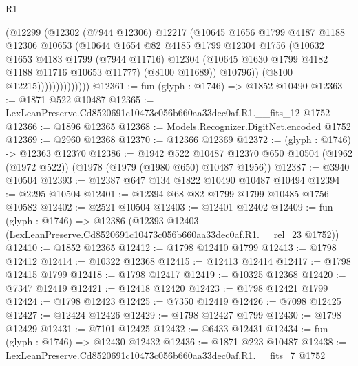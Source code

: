 \begin{lexlean}{R1}
\begin{coremodule}
                          (@12299
                            (@12302
                              (@7944 @12306)
                              @12217
                              (@10645
                                @1656
                                @1799
                                @4187
                                @1188
                                @12306
                                @10653
                                (@10644
                                  @1654
                                  @82
                                  @4185
                                  @1799
                                  @12304
                                  @1756
                                  (@10632
                                    @1653
                                    @4183
                                    @1799
                                    (@7944 @11716)
                                    @12304
                                    (@10645 @1630 @1799 @4182 @1188 @11716 @10653 @11777)
                                    (@8100 @11689))
                                  @10796))
                              (@8100 @12215))))))))))))))
@12361 := fun (glyph : @1746) => @1852 @10490
@12363 := @1871 @522 @10487
@12365 := LexLeanPreserve.Cd8520691c10473c056b660aa33dec0af.R1.__fits_12 @1752
@12366 := @1896 @12365
@12368 := Models.Recognizer.DigitNet.encoded @1752
@12369 := @2960 @12368
@12370 := @12366 @12369
@12372 := (glyph : @1746) -> @12363 @12370
@12386 := @1942
    @522
    @10487
    @12370
    @650
    @10504
    (@1962 (@1972 @522))
    (@1978 (@1979 (@1980 @650) @10487 @1956))
@12387 := @3940 @10504
@12393 := @12387 @647 @134 @1822 @10490 @10487 @10494
@12394 := @2295 @10504
@12401 := @12394 @68 @82 @1799 @1799 @10485 @1756 @10582
@12402 := @2521 @10504
@12403 := @12401 @12402
@12409 := fun (glyph : @1746) =>
  @12386 (@12393 @12403 (LexLeanPreserve.Cd8520691c10473c056b660aa33dec0af.R1.__rel_23 @1752))
@12410 := @1852 @12365
@12412 := @1798 @12410 @1799
@12413 := @1798 @12412
@12414 := @10322 @12368
@12415 := @12413 @12414
@12417 := @1798 @12415 @1799
@12418 := @1798 @12417
@12419 := @10325 @12368
@12420 := @7347 @12419
@12421 := @12418 @12420
@12423 := @1798 @12421 @1799
@12424 := @1798 @12423
@12425 := @7350 @12419
@12426 := @7098 @12425
@12427 := @12424 @12426
@12429 := @1798 @12427 @1799
@12430 := @1798 @12429
@12431 := @7101 @12425
@12432 := @6433 @12431
@12434 := fun (glyph : @1746) => @12430 @12432
@12436 := @1871 @223 @10487
@12438 := LexLeanPreserve.Cd8520691c10473c056b660aa33dec0af.R1.__fits_7 @1752

\end{coremodule}
\end{lexlean}
